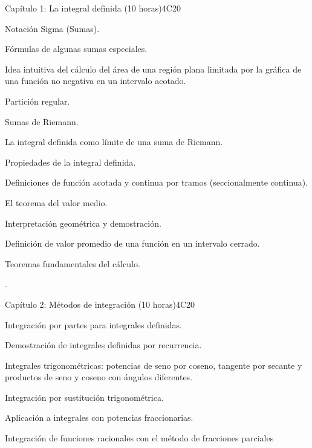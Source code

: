 \begin{syllabus}
\begin{unit}{Capítulo 1: La integral definida (10 horas)}{}{}{4}{C20}
\begin{topics}
      \item Notación Sigma (Sumas). 
      \item Fórmulas de algunas sumas especiales.
      \item Idea intuitiva del cálculo del área de una región plana limitada por la gráfica de una función no negativa en un intervalo acotado.
      \item Partición regular.
      \item Sumas de Riemann.
      \item La integral definida como límite de una suma de Riemann. 
      \item Propiedades de la integral definida.
      \item Definiciones de función acotada y continua por tramos (seccionalmente continua).
      \item El teorema del valor medio.
      \item Interpretación geométrica y demostración. 
      \item Definición de valor promedio de una función en un intervalo cerrado.
      \item Teoremas fundamentales del cálculo.      
   \end{topics}

   \begin{learningoutcomes}
      \item .
   \end{learningoutcomes}
\end{unit}

\begin{unit}{Capítulo 2: Métodos de integración (10 horas)}{}{}{4}{C20}


\begin{topics}
      \item Integración por partes para integrales definidas.
      \item Demostración de integrales definidas por recurrencia. 
      \item Integrales trigonométricas: potencias de seno por coseno, tangente por secante y productos de seno y coseno con ángulos diferentes.
      \item Integración por sustitución trigonométrica. 
      \item Aplicación a integrales con potencias fraccionarias.
      \item Integración de funciones racionales con el método de fracciones parciales
   \end{topics}
\end{unit}


\end{syllabus}
